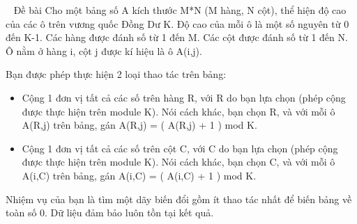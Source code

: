  
Đề bài
Cho một bảng số A kích thước M*N (M hàng, N cột), thể hiện độ cao của các ô trên vương quốc Đồng Dư K. Độ cao của mỗi ô là một số nguyên từ 0 đến K-1. Các hàng được đánh số từ 1 đến M. Các cột được đánh số từ 1 đến N. Ô nằm ở hàng i, cột j được kí hiệu là ô A(i,j).

Bạn được phép thực hiện 2 loại thao tác trên bảng:
\begin{itemize}
	\item Cộng 1 đơn vị tất cả các số trên hàng R, với R do bạn lựa chọn (phép cộng được thực hiện trên module K). Nói cách khác, bạn chọn R, và với mỗi ô A(R,j) trên bảng, gán A(R,j) = ( A(R,j) + 1 ) mod K.
	\item Cộng 1 đơn vị tất cả các số trên cột C, với C do bạn lựa chọn (phép cộng được thực hiện trên module K). Nói cách khác, bạn chọn C, và với mỗi ô A(i,C) trên bảng, gán A(i,C) = ( A(i,C) + 1 ) mod K.
\end{itemize}

Nhiệm vụ của bạn là tìm một dãy biến đổi gồm ít thao tác nhất để biến bảng về toàn số 0. Dữ liệu đảm bảo luôn tồn tại kết quả.
